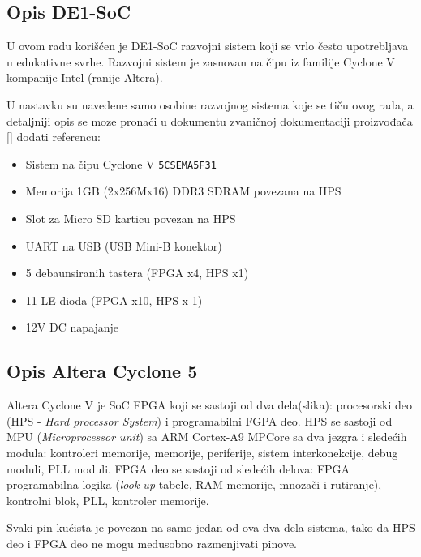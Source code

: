\subsection{Opis DE1-SoC}

U ovom radu korišćen je DE1-SoC razvojni sistem koji se vrlo često upotrebljava u edukativne svrhe. Razvojni sistem je zasnovan na čipu iz familije Cyclone V kompanije Intel (ranije Altera).

U nastavku su navedene samo osobine razvojnog sistema koje se tiču ovog rada, a detaljniji opis se moze pronaći u dokumentu zvaničnoj dokumentaciji proizvođača []
dodati referencu: 
\begin{itemize}
\item Sistem na čipu Cyclone V \texttt{5CSEMA5F31}
\item Memorija 1GB (2x256Mx16) DDR3 SDRAM povezana na HPS
\item Slot za Micro SD karticu povezan na HPS
\item UART na USB (USB Mini-B konektor)
\item 5 debaunsiranih tastera (FPGA x4, HPS x1)
\item 11 LE dioda (FPGA x10, HPS x 1)
\item 12V DC napajanje
\end{itemize}

\subsection{Opis Altera Cyclone 5}
Altera Cyclone V je SoC FPGA koji se sastoji od dva dela(slika): procesorski deo (HPS -  \textit{Hard processor System}) i programabilni FGPA deo. HPS se sastoji od MPU (\textit{Microprocessor unit}) sa ARM Cortex-A9 MPCore sa dva jezgra i sledećih modula: kontroleri memorije, memorije, periferije, sistem interkonekcije, debug moduli, PLL moduli. FPGA deo se sastoji od sledećih delova: FPGA programabilna logika (\textit{look-up} tabele, RAM memorije, mnozači i rutiranje), kontrolni blok, PLL, kontroler memorije.

Svaki pin kućista je povezan na samo jedan od ova dva dela sistema, tako da HPS deo i FPGA deo ne mogu međusobno razmenjivati pinove.

